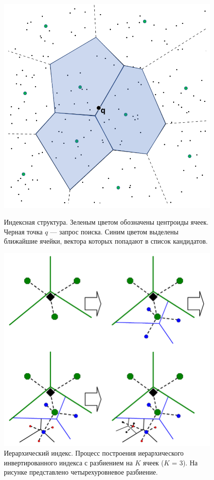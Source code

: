 \begin{figure}[h]
\begin{minipage}[h]{0.48\linewidth}
\includegraphics[width=1\linewidth]{Images/Index.png}
\caption{Индексная структура. Зеленым цветом обозначены центроиды ячеек. Черная точка $q$ — запрос поиска. Синим цветом выделены ближайшие ячейки, вектора которых попадают в список кандидатов.}
\label{ris:index}
\end{minipage}
\hfill
\begin{minipage}[h]{0.48\linewidth}
\includegraphics[width=1\linewidth]{Images/HierarchicalIndex.png}
\caption{Иерархический индекс. Процесс построения иерархического инвертированного индекса с разбиением на $K$ ячеек ($K$ = 3). На рисунке представлено четырехуровневое разбиение.}
\label{ris:hierachicalindex}
\end{minipage}
\end{figure}

